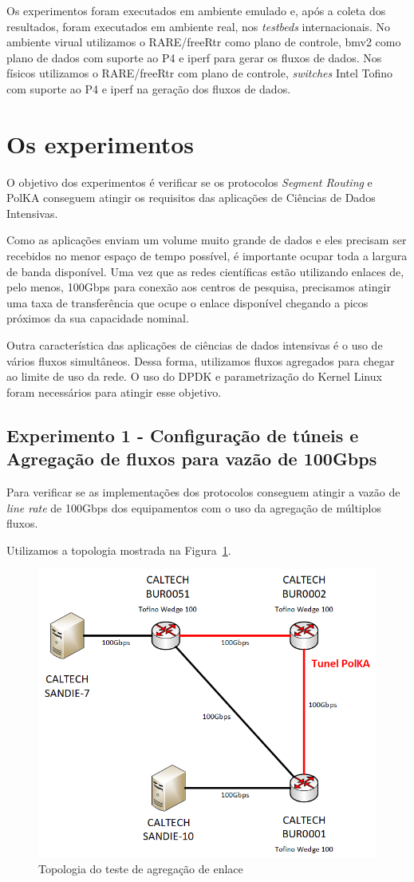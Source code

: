 \documentclass[12pt]{article}
\begin{document}
Os experimentos foram executados em ambiente emulado e, após a coleta dos resultados, foram executados em ambiente real, nos \textit{testbeds} internacionais.
No ambiente virual utilizamos o RARE/freeRtr como plano de controle, bmv2 como plano de dados com suporte ao P4 e iperf para gerar os fluxos de dados.
Nos  físicos utilizamos o RARE/freeRtr com plano de controle, \textit{switches} Intel Tofino com suporte ao P4 e iperf na geração dos fluxos de dados.

\section{Os experimentos}

O objetivo dos experimentos é verificar se os protocolos \textit{Segment Routing} e PolKA conseguem atingir os requisitos das aplicações de Ciências de Dados Intensivas.

Como as aplicações enviam um volume muito grande de dados e eles precisam ser recebidos no menor espaço de tempo possível, é importante ocupar toda a largura de banda disponível. Uma vez que as redes científicas estão utilizando enlaces de, pelo menos, 100Gbps para conexão aos centros de pesquisa, precisamos atingir uma taxa de transferência que ocupe o enlace disponível chegando a picos próximos da sua capacidade nominal.

Outra característica das aplicações de ciências de dados intensivas é o uso de vários fluxos simultâneos. Dessa forma, utilizamos fluxos agregados para chegar ao limite de uso da rede. O uso do DPDK e parametrização do Kernel Linux foram necessários para atingir esse objetivo.

\subsection{Experimento 1 - Configuração de túneis e Agregação de fluxos para vazão de 100Gbps}

Para verificar se as implementações dos protocolos conseguem atingir a vazão de \textit{line rate} de 100Gbps dos equipamentos com o uso da agregação de múltiplos fluxos.

Utilizamos a topologia mostrada na Figura~\ref{fig:topologia2}.

\begin{figure}[ht]
\centering
\includegraphics[width=.5\textwidth]{Topologias-polka 2.png}
\caption{Topologia do teste de agregação de enlace}
\label{fig:topologia2}
\end{figure}
\end{document}
